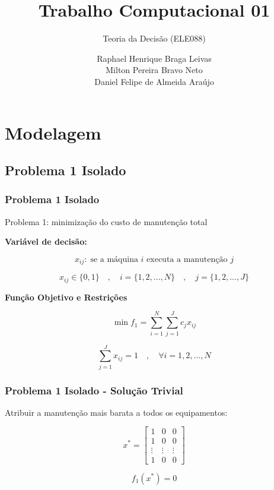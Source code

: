 \documentclass{beamer}
\title[Short Paper Title]  
{Trabalho Computacional 01}
\subtitle
{Teoria da Decisão (ELE088)}
\author 
 { Raphael Henrique Braga Leivas \\
 Milton Pereira Bravo Neto \\ 
 Daniel Felipe de Almeida Araújo}
\institute 
{
Curso de Bacharelado em Engenharia de Sistemas\\
Universidade Federal de Minas Gerais
}
\date{}
\newcommand{\un}[1]{\;\text{#1}}
\begin{document}
\begin{frame}
    \titlepage
\end{frame}

\section{Modelagem}
    
    \subsection{Problema 1 Isolado}
    \begin{frame}
        \frametitle{Problema 1 Isolado}

        \begin{center}
            Problema 1: minimização do custo de manutenção total
        \end{center}

        \vspace{0.5cm}

        \textbf{Variável de decisão:}

        \[  x_{ij}: \un{se a máquina $i$ executa a manutenção $j$}  \]
        
        \[ x_{ij} \in \{0,1\} \quad , \quad i = \{1, 2, ..., N\}  \quad , \quad j = \{1, 2, ..., J\} \]

        \vspace{0.5cm}

        \textbf{Função Objetivo e Restrições}

        \[  \min f_1 = \sum_{i=1}^{N} \sum_{j=1}^{J} c_j x_{ij} \]

        \[ \sum_{j=1}^{J} x_{ij} = 1 \quad , \quad \forall i = {1, 2, ..., N} \]
    \end{frame}

    \begin{frame}
        \frametitle{Problema 1 Isolado - Solução Trivial}

        \begin{center}
            Atribuir a manutenção mais barata a todos os equipamentos:
        \end{center}


        \[ x^{*} = \begin{bmatrix} 
            1 & 0 & 0 \\
            1 & 0 & 0 \\
            \vdots & \vdots & \vdots \\
            1 &  0      & 0 
            \end{bmatrix} \]

        \vspace{1cm}

       \[ f_1\left(x^{*}\right) =  0 \]
    \end{frame}
\end{document}

